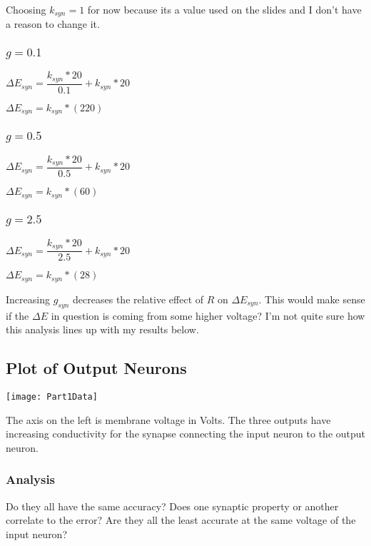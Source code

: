 Choosing $k_{syn} = 1$ for now because its a value used on the slides and I
don't have a reason to change it. 

\subsubsection{$g = 0.1$}

$\Delta E_{syn} = \dfrac{k_{syn} * 20}{0.1} + k_{syn} * 20$

$\Delta E_{syn} = k_{syn} * (220)$

\subsubsection{$g = 0.5$}

$\Delta E_{syn} = \dfrac{k_{syn} * 20}{0.5} + k_{syn} * 20$

$\Delta E_{syn} = k_{syn} * (60)$

\subsubsection{$g = 2.5$}

$\Delta E_{syn} = \dfrac{k_{syn} * 20}{2.5} + k_{syn} * 20$

$\Delta E_{syn} = k_{syn} * (28)$

Increasing $g_{syn}$ decreases the relative effect of $R$ on $\Delta E_{syn}$. This would make sense if the $\Delta E$ in question is coming from some higher voltage? I'm not quite sure how this analysis lines up with my results below.

\subsection{Plot of Output Neurons}

\texttt{[image: Part1Data]}

The axis on the left is membrane voltage in Volts. The three outputs have increasing conductivity for the synapse connecting the input neuron to the output neuron.

\subsubsection{Analysis}

Do they all have the same accuracy? Does one synaptic property or another
correlate to the error? Are they all the least accurate at the same voltage 
of the input neuron?

